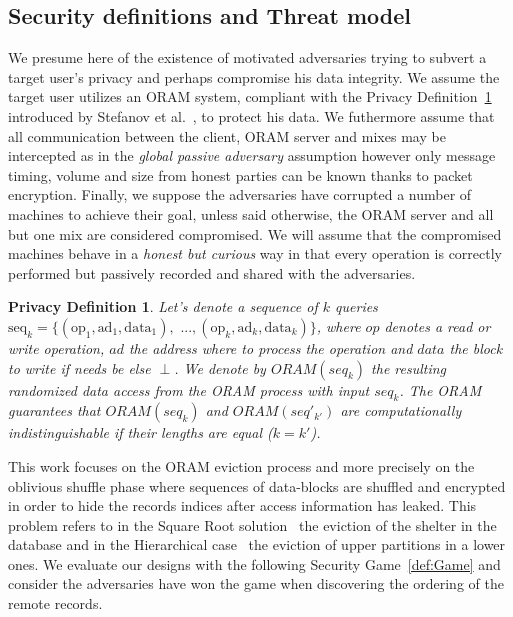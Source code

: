 \documentclass[USenglish,oneside,twocolumn]{article}
\newtheorem{privdef}{Privacy Definition}
\begin{document}
\subsection{Security definitions and Threat model}\label{Threat}

We presume here of the existence of motivated adversaries trying to subvert a target user's privacy and perhaps compromise his data integrity. We assume the target user utilizes an ORAM system, compliant with the Privacy Definition~\ref{def:Oram} introduced by Stefanov et al.~\cite{stefanov2011towards}, to protect his data.
We futhermore assume that all communication between the client, ORAM server and mixes may be intercepted as in the \textit{global passive adversary} assumption however only message timing, volume and size from honest parties can be known thanks to packet encryption.
Finally, we suppose the adversaries have corrupted a number of machines to achieve their goal, unless said otherwise, the ORAM server and all but one mix are considered compromised. We will assume that the compromised machines behave in a \textit{honest but curious} way in that every operation is correctly performed but passively recorded and shared with the adversaries.

\begin{privdef}\label{def:Oram}
Let's denote a sequence of $k$ queries $\text{seq}_k=\{(\text{op}_1, \text{ad}_1, \text{data}_1), \text{ ...},(\text{op}_k, \text{ad}_k, \text{data}_k)\}$, where $op$ denotes a read or write operation, $ad$ the address where to process the operation and $data$ the block to write if needs be else $\perp$.
We denote by $ORAM(seq_k)$ the resulting randomized data access from the ORAM process with input $seq_k$.
The ORAM guarantees that $ORAM(seq_k)$ and $ORAM(seq'_{k'})$ are computationally indistinguishable if their lengths are equal ($k=k'$).
\end{privdef}

This work focuses on the ORAM eviction process and more precisely on the oblivious shuffle phase where sequences of data-blocks are shuffled and encrypted in order to hide the records indices after access information has leaked. This problem refers to in the Square Root solution~\cite{ostrovsky1990efficient} the eviction of the shelter in the database and in the Hierarchical case~\cite{goldreich1996software} the eviction of upper partitions in a lower ones. We evaluate our designs with the following Security Game~\ref{def:Game} and consider the adversaries have won the game when discovering the ordering of the remote records.
\end{document}
